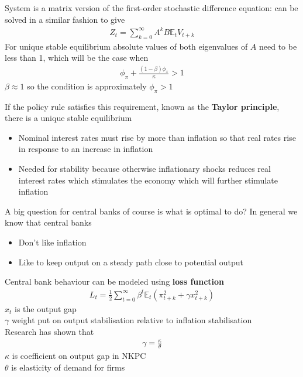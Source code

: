 \documentclass{beamer}
\begin{document}
\begin{frame}
  System is a matrix version of the first-order stochastic difference equation: can be solved in a similar fashion to give
\begin{align}
  Z_t=\sum_{k=0}^{\infty}A^k B\mathbb{E}_tV_{t+k}
\end{align}
 For unique stable equilibrium absolute values of both eigenvalues of $A$ need to be less than 1, which will be the case when
\begin{align}  
  \phi_{\pi}+\frac{(1-\beta)\phi_x}{\kappa}>1 
\end{align}
$\beta \approx 1$ so the condition is approximately $\phi_{\pi}>1$
\end{frame}

\begin{frame}
  If the policy rule satisfies this requirement, known as the \textbf{Taylor principle}, there is a unique stable equilibrium
  \begin{itemize}
    \item Nominal interest rates must rise by more than inflation so that real rates rise in response to an increase in inflation
    \item Needed for stability because otherwise inflationary shocks reduces real interest rates which stimulates the economy which will further stimulate inflation
  \end{itemize}
  \medskip
  A big question for central banks of course is what is optimal to do? 
  In general we know that central banks 
\begin{itemize}
  \item Don't like inflation 
  \item Like to keep output on a steady path close to potential output
\end{itemize}
\end{frame}

\begin{frame}  
   Central bank behaviour can be modeled using \textbf{loss function}
  \begin{align} 
  L_t = \frac{1}{2}\sum_{t=0}^{\infty}\beta^t\mathbb{E}_t(\pi_{t+k}^2 + \gamma x_{t+k}^2) 
\end{align}
$x_t$ is the output gap\\
$\gamma$ weight put on output stabilisation relative to inflation stabilisation\\
\medskip
Research has shown that 
 \begin{align}
   \gamma=\frac{\kappa}{\theta}   
 \end{align}
 $\kappa$ is coefficient on output gap in NKPC\\
 $\theta$ is elasticity of demand for firms 
\end{frame}
\end{document}
